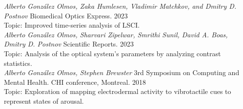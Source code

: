\textit {Alberto Gonz\'alez Olmos, Zaka Humlesen, Vladimir Matchkov, and Dmitry D. Postnov}
Biomedical Optics Express. 2023
\\
Topic: Improved time-series analysis of LSCI.
\\

\textit {Alberto Gonz\'alez Olmos, Sharvari Zipelwar, Smrithi Sunil, David A. Boas, Dmitry D. Postnov}
Scientific Reports. 2023
\\
Topic: Analysis of the optical system's parameters by analyzing contrast statistics.
\\

\textit {Alberto Gonz\'alez Olmos, Stephen Brewster}
3rd Symposium on Computing and Mental Health. CHI conference, Montreal. 2018
\\
Topic: Exploration of mapping electrodermal activity to vibrotactile cues to represent states of arousal.
\\


